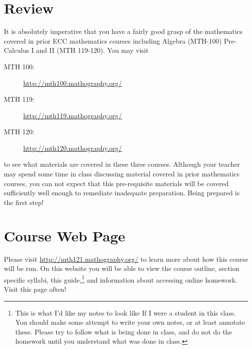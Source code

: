 \documentclass[12pt,addpoints, answers, fleqn]{exam}
\begin{document}
\runningheadrule 
{} 

\runningfootrule
{} 

\tableofcontents

\vfill
\pagebreak

\begin{center} 
\end{center} 

\vfill
\pagebreak



\section{Review}
It is absolutely imperative that you have a fairly good grasp of the mathematics covered in prior ECC mathematics courses including Algebra (MTH-100) Pre-Calculus I and II (MTH 119-120). You may visit
\begin{description}
\item[MTH 100:] \url{http://mth100.mathography.org/}
\item[MTH 119:] \url{http://mth119.mathography.org/}
\item[MTH 120:] \url{http://mth120.mathography.org/}
\end{description}
to see what materials are covered in these three courses. Although your teacher may spend some time in class  discussing material covered in prior mathematics courses, you can not expect that this pre-requisite materials will be covered sufficiently well enough to remediate inadequate preparation. Being prepared is the first step!

\vfill
\pagebreak




\section{Course Web Page}
Please visit \url{http://mth121.mathography.org/} to learn more about how this course will be run. On this website you will be able to view the course outline, section specific syllabi,  this guide,\footnote{This is what I'd like my notes to look like If I were a student in this class. You should make some attempt to write your own notes, or at least annotate these. Please try to follow what is being done in class, and do not do the homework until you understand what was done in class.} and information about accessing online homework. Visit this page often!
\end{document}
